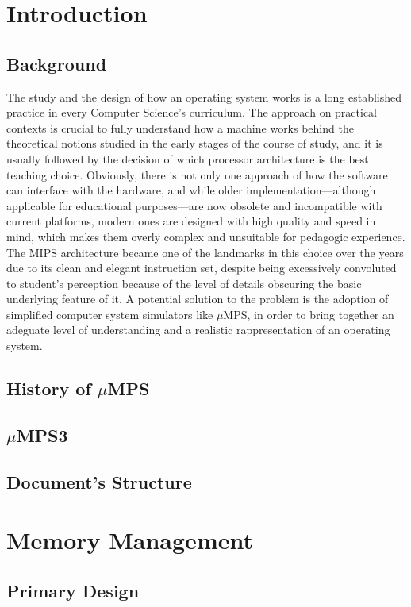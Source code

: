 \documentclass[12pt,a4paper,openright,twoside]{report}
\begin{document}
\chapter{Introduction}
\lhead[\fancyplain{}{\bfseries\thepage}]{\fancyplain{}{\bfseries\rightmark}}
\section{Background}
The study and the design of how an operating system works is a long established practice in every Computer Science's curriculum.
The approach on practical contexts is crucial to fully understand how a machine works behind the theoretical notions studied in the early stages of the course of study, and it is usually followed by the decision of which processor architecture is the best teaching choice.
Obviously, there is not only one approach of how the software can interface with the hardware, and while older implementation---although applicable for educational purposes---are now obsolete and incompatible with current platforms, modern ones are designed with high quality and speed in mind, which makes them overly complex and unsuitable for pedagogic experience.
The MIPS architecture became one of the landmarks in this choice over the years due to its clean and elegant instruction set, despite being excessively convoluted to student’s perception because of the level of details obscuring the basic underlying feature of it.
A potential solution to the problem is the adoption of simplified computer system simulators like $\mu$MPS, in order to bring together an adeguate level of understanding and a realistic rappresentation of an operating system.
\section{History of $\mu$MPS}
\section{$\mu$MPS3}
\section{Document's Structure}
\chapter{Memory Management}
\lhead[\fancyplain{}{\bfseries\thepage}]{\fancyplain{}{\bfseries\rightmark}}

\section{Primary Design}
\end{document}

